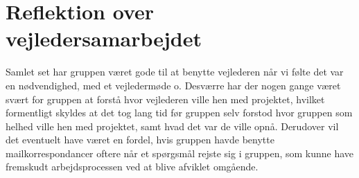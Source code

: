 \section{Reflektion over vejledersamarbejdet}\label{Reflektion-over-vejledersamarbejdet}
Samlet set har gruppen været gode til at benytte vejlederen når vi følte det var en nødvendighed, med et vejledermøde o. Desværre har der nogen gange været svært for gruppen at forstå hvor vejlederen ville hen med projektet, hvilket formentligt skyldes at det tog lang tid før gruppen selv forstod hvor gruppen som helhed ville hen med projektet, samt hvad det var de ville opnå. Derudover vil det eventuelt have været en fordel, hvis gruppen havde benytte mailkorrespondancer oftere når et spørgsmål rejste sig i gruppen, som kunne have fremskudt arbejdsprocessen ved at blive afviklet omgående.
